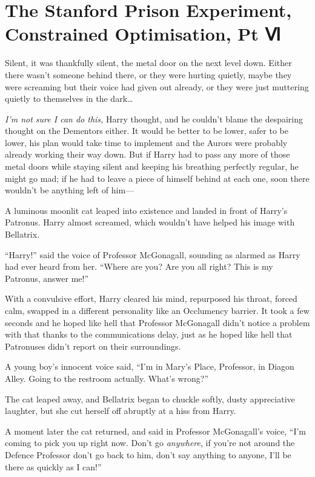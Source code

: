 \chapter{The Stanford Prison Experiment, Constrained Optimisation, Pt
Ⅵ}\label{the-stanford-prison-experiment-constrained-optimisation-pt}

Silent, it was thankfully silent, the metal door on the next level down.
Either there wasn't someone behind there, or they were hurting quietly,
maybe they were screaming but their voice had given out already, or they
were just muttering quietly to themselves in the dark\ldots{}

\emph{I'm not sure I can do this,} Harry thought, and he couldn't blame
the despairing thought on the Dementors either. It would be better to be
lower, safer to be lower, his plan would take time to implement and the
Aurors were probably already working their way down. But if Harry had to
pass any more of those metal doors while staying silent and keeping his
breathing perfectly regular, he might go mad; if he had to leave a piece
of himself behind at each one, soon there wouldn't be anything left of
him---

A luminous moonlit cat leaped into existence and landed in front of
Harry's Patronus. Harry almost screamed, which wouldn't have helped his
image with Bellatrix.

``Harry!'' said the voice of Professor McGonagall, sounding as alarmed
as Harry had ever heard from her. ``Where are you? Are you all right?
This is my Patronus, answer me!''

With a convulsive effort, Harry cleared his mind, repurposed his throat,
forced calm, swapped in a different personality like an Occlumency
barrier. It took a few seconds and he hoped like hell that Professor
McGonagall didn't notice a problem with that thanks to the
communications delay, just as he hoped like hell that Patronuses didn't
report on their surroundings.

A young boy's innocent voice said, ``I'm in Mary's Place, Professor, in
Diagon Alley. Going to the restroom actually. What's wrong?''

The cat leaped away, and Bellatrix began to chuckle softly, dusty
appreciative laughter, but she cut herself off abruptly at a hiss from
Harry.

A moment later the cat returned, and said in Professor McGonagall's
voice, ``I'm coming to pick you up right now. Don't go \emph{anywhere},
if you're not around the Defence Professor don't go back to him, don't
say anything to anyone, I'll be there as quickly as I can!''

